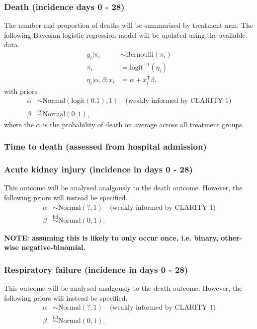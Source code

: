 \documentclass[11pt,parskip=half-]{scrartcl}
\begin{document}
\subsubsection{Death (incidence days 0 - 28)}
The number and proportion of deaths will be summarised by treatment arm. The following Bayesian logistic regression model will be updated using the available data.
$$
    \begin{aligned}
        y_i | \pi_i              & \sim \text{Bernoulli}(\pi_i)    \\
        \pi_i                    & = \text{logit}^{-1}(\eta_i)     \\
        \eta_i|\alpha,\beta; x_i & = \alpha + x_i^\mathsf{T}\beta,
    \end{aligned}
$$
with priors
$$
    \begin{aligned}
        \alpha & \sim \text{Normal}(\text{logit}(0.1), 1) \quad \text{(weakly informed by CLARITY 1)} \\
        \beta  & \overset{\text{iid}}{\sim} \text{Normal}(0, 1),
    \end{aligned}
$$
where the $\alpha$ is the probability of death on average across all treatment groups.

\subsubsection{Time to death (assessed from hospital admission)}


\subsubsection{Acute kidney injury (incidence in days 0 - 28)}
This outcome will be analysed analgously to the death outcome. However, the following priors will instead be specified.
$$
    \begin{aligned}
        \alpha & \sim \text{Normal}(?, 1) \quad \text{(weakly informed by CLARITY 1)} \\
        \beta  & \overset{\text{iid}}{\sim} \text{Normal}(0, 1).
    \end{aligned}
$$

\textbf{NOTE: assuming this is likely to only occur once, i.e. binary, other-wise negative-binomial.}

\subsubsection{Respiratory failure (incidence in days 0 - 28)}
This outcome will be analysed analgously to the death outcome. However, the following priors will instead be specified.
$$
    \begin{aligned}
        \alpha & \sim \text{Normal}(?, 1) \quad \text{(weakly informed by CLARITY 1)} \\
        \beta  & \overset{\text{iid}}{\sim} \text{Normal}(0, 1).
    \end{aligned}
$$
\end{document}
